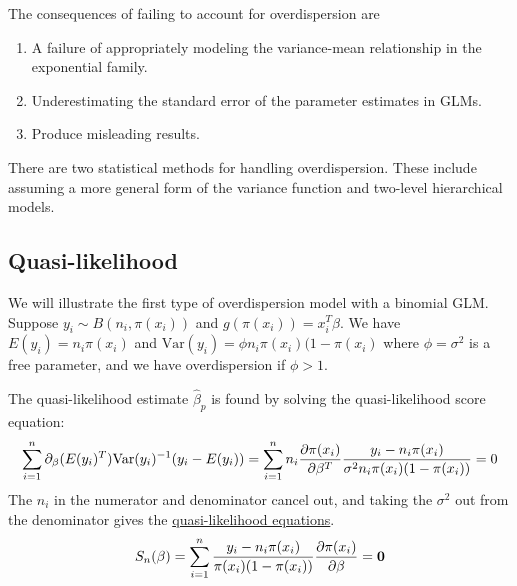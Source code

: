 \documentclass[12pt]{article}
\newcommand{\Var}{\mathrm{Var}}
\newcommand{\sumn}{\sum_{i=1}^n}
\newcommand{\bhat}{\hat{\beta}}
\numberwithin{equation}{section}
\begin{document}
The consequences of failing to account for overdispersion are
\begin{enumerate}
  \item A failure of appropriately modeling the variance-mean relationship in the exponential family.
  \item Underestimating the standard error of the parameter estimates in GLMs.
  \item Produce misleading results.
\end{enumerate}

There are two statistical methods for handling overdispersion. These include assuming a more general form of the variance function and two-level hierarchical models.

\subsection{Quasi-likelihood}
We will illustrate the first type of overdispersion model with a binomial GLM. Suppose $y_i \sim B(n_i, \pi(x_i))$ and $g(\pi(x_i)) = x_i^T \beta$. We have $E(y_i) = n_i \pi(x_i)$ and 
$\Var(y_i) = \phi n_i \pi(x_i) (1 - \pi(x_i)$ where $\phi = \sigma^2$ is a free parameter, and we have overdispersion if $\phi > 1$. 

The quasi-likelihood estimate $\bhat_p$ is found by solving the quasi-likelihood score equation:
%
\begin{equation*}
  \sumn \partial_{\beta} (E(y_i)^T) \Var(y_i)^{-1} (y_i - E(y_i))
  = \sumn n_i \pdv{\pi(x_i)}{\beta^T}
    \frac{y_i - n_i \pi(x_i)}{\sigma^2 n_i \pi(x_i)(1 - \pi(x_i))}
  = 0
\end{equation*}
The $n_i$ in the numerator and denominator cancel out, and taking the $\sigma^2$ out from the denominator gives the \underline{quasi-likelihood equations}.
\begin{equation*}
  S_n(\beta) = \sumn \frac{y_i - n_i \pi(x_i)}{\pi(x_i)(1 - \pi(x_i))} \pdv{\pi(x_i)}{\beta} = \mathbf{0}
\end{equation*}
\end{document}
